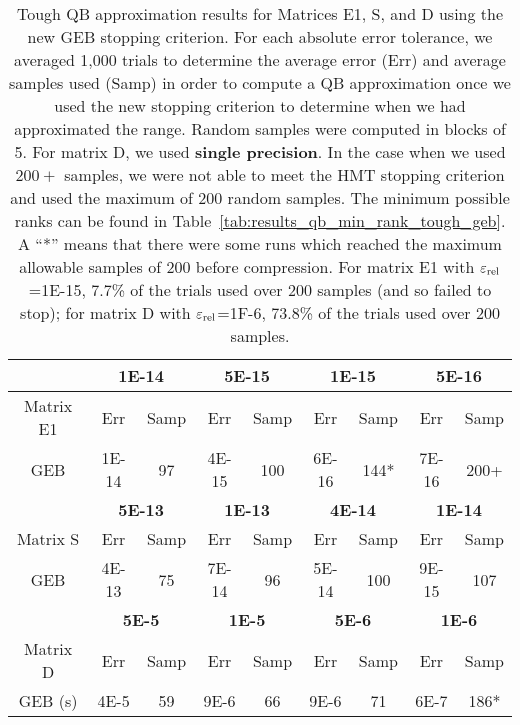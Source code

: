 
\begin{table}
\begin{center}
\begin{tabular}{|c|c|c|c|c|c|c|c|c|}
\cline{2-9}
\multicolumn{1}{c|}{} &
\multicolumn{2}{|c|}{\textbf{1E-14}} & \multicolumn{2}{|c|}{\textbf{5E-15}} &
\multicolumn{2}{|c|}{\textbf{1E-15}} & \multicolumn{2}{|c|}{\textbf{5E-16}} \\
\hline
Matrix E1 &
Err & Samp & Err & Samp &
Err & Samp & Err & Samp \\
\hline
GEB & 1E-14 & 97 & 4E-15 & 100 & 6E-16  & 144* & 7E-16 & 200+ \\
\hline
\hline
\multicolumn{1}{c|}{} &
\multicolumn{2}{|c|}{\textbf{5E-13}} & \multicolumn{2}{|c|}{\textbf{1E-13}} &
\multicolumn{2}{|c|}{\textbf{4E-14}} & \multicolumn{2}{|c|}{\textbf{1E-14}} \\
\hline
Matrix S &
Err & Samp & Err & Samp &
Err & Samp & Err & Samp \\
\hline
GEB & 4E-13 & 75 & 7E-14 & 96 & 5E-14 & 100 & 9E-15 & 107 \\
\hline
\hline
\multicolumn{1}{c|}{} &
\multicolumn{2}{|c|}{\textbf{5E-5}} & \multicolumn{2}{|c|}{\textbf{1E-5}} &
\multicolumn{2}{|c|}{\textbf{5E-6}} & \multicolumn{2}{|c|}{\textbf{1E-6}} \\
\hline
Matrix D &
Err & Samp & Err & Samp &
Err & Samp & Err & Samp \\
\hline
GEB (s) & 4E-5 & 59 & 9E-6 & 66 & 9E-6 & 71 & 6E-7 & 186* \\
\hline
\end{tabular}
\end{center}
\caption[QB Adaptive Approximation Results (Stringent GEB Tests)]{
Tough QB approximation results for Matrices E1, S, and D
using the new GEB stopping criterion.
For each absolute error tolerance, we averaged 1,000 trials to determine
the average error (Err) and average samples used (Samp) in order to compute
a QB approximation once we used the new stopping criterion to
determine when we had approximated the range.
Random samples were computed in blocks of 5.
For matrix D, we used \textbf{single precision}.
In the case when we used $200+$ samples,
we were not able to meet the HMT stopping criterion
and used the maximum of 200 random samples.
The minimum possible ranks can be found in
Table~\ref{tab:results_qb_min_rank_tough_geb}.
A ``*'' means that there were some runs which reached the maximum allowable
samples of 200 before compression.
For matrix E1 with $\varepsilon_{\text{rel}}$=1E-15, 7.7\% of the trials used over 200 samples
(and so failed to stop);
for matrix D  with $\varepsilon_{\text{rel}}$=1F-6, 73.8\% of the trials used over 200 samples.
}
\label{tab:results_qb_approx_mat_geb_hard}
\end{table}
